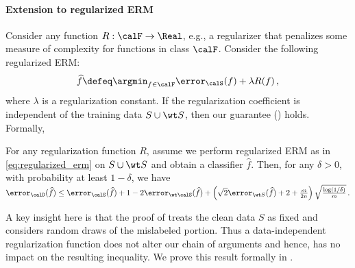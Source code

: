 \paragraph{Extension to regularized ERM} 
Consider any function $R: \calF \to \Real$,
e.g., a regularizer 
that penalizes some measure of complexity 
for functions in class $\calF$.
Consider the following regularized ERM:
\begin{align}
    \widehat f \defeq \argmin_{f\in \calF} \error_\calS(f) + \lambda R(f) \,, \label{eq:regularized_erm}
\end{align}
where $\lambda$ is a regularization constant. 
If the regularization coefficient is independent 
of the training data $S \cup \wt S$, 
then our guarantee () holds.
Formally,
\begin{theorem} \label{thm:error_regularized_ERM}
    For any regularization function $R$, 
    assume we perform regularized ERM 
    as in \eqref{eq:regularized_erm} on $S \cup \wt S$ 
    and obtain a classifier $\widehat f$.
    Then, for any $\delta > 0$, 
    with probability at least $1-\delta$, we have
        $\error_\calD(\widehat f)  \le \error_\calS(\widehat f) + 1 - 2 \error_{\wt\calS}(\widehat f) + \left(\sqrt{2} \error_{\wt S}(\widehat f)  + 2 + \frac{m}{2n}\right)  \sqrt{\frac{\log(1/\delta)}{m}} \,.$ %
\end{theorem}

A key insight here is 
that the proof of  
treats the clean data $S$ as fixed
and considers random draws of the mislabeled portion.
Thus a data-independent 
regularization function does not
%
alter our chain of arguments and hence,
has no impact on the resulting inequality.
We prove this result formally in .





